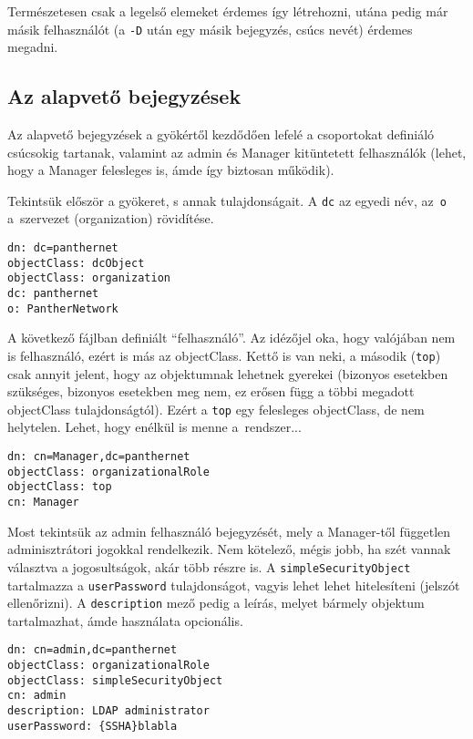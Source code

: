 Természetesen csak a legelső elemeket érdemes így létrehozni, utána pedig már másik felhasználót (a \texttt{-D} után egy
másik bejegyzés, csúcs nevét) érdemes megadni.


\subsection{Az alapvető bejegyzések}

Az alapvető bejegyzések a gyökértől kezdődően lefelé a csoportokat definiáló csúcsokig tartanak, valamint az admin és
Manager kitüntetett felhasználók (lehet, hogy a Manager felesleges is, ámde így biztosan működik).

Tekintsük először a gyökeret, s annak tulajdonságait.
A \texttt{dc} az egyedi név, az~\texttt{o} a~szervezet (organization) rövidítése.

\begin{Verbatim}[frame=single]
dn: dc=panthernet
objectClass: dcObject
objectClass: organization
dc: panthernet
o: PantherNetwork  
\end{Verbatim}


\noindent A következő  fájlban definiált ``felhasználó''. Az idézőjel oka, hogy valójában nem is
felhasználó, ezért is más az objectClass. Kettő is van neki, a második (\texttt{top}) csak annyit jelent, hogy az
objektumnak lehetnek gyerekei (bizonyos esetekben szükséges, bizonyos esetekben meg nem, ez erősen függ a többi megadott
objectClass tulajdonságtól). Ezért a \texttt{top} egy felesleges objectClass, de nem helytelen. Lehet, hogy enélkül is
menne a~rendszer...


\begin{Verbatim}[frame=single]
dn: cn=Manager,dc=panthernet
objectClass: organizationalRole
objectClass: top
cn: Manager
\end{Verbatim}

\noindent Most tekintsük az admin felhasználó bejegyzését, mely a Manager-től független adminisztrátori jogokkal
rendelkezik. Nem kötelező, mégis jobb, ha szét vannak választva a jogosultságok, akár több részre is. A
\texttt{simpleSecurityObject} tartalmazza a \texttt{userPassword} tulajdonságot, vagyis lehet lehet hitelesíteni
(jelszót ellenőrizni). A \texttt{description} mező pedig a leírás, melyet bármely objektum tartalmazhat, ámde használata
opcionális.


\begin{Verbatim}[frame=single]
dn: cn=admin,dc=panthernet
objectClass: organizationalRole
objectClass: simpleSecurityObject
cn: admin
description: LDAP administrator
userPassword: {SSHA}blabla
\end{Verbatim}


